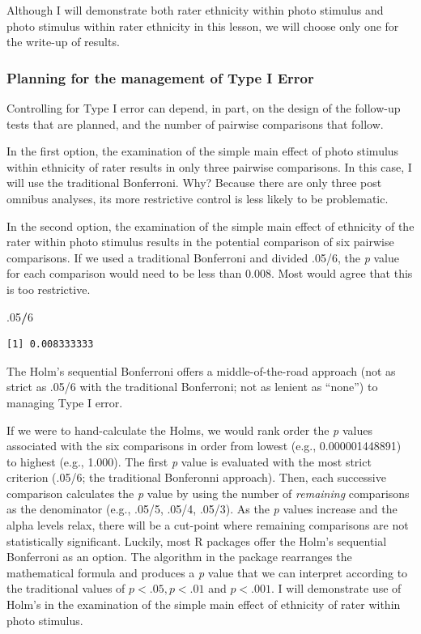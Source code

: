 \documentclass[
  11pt,
]{book}
\newenvironment{Shaded}{\begin{snugshade}}{\end{snugshade}}
\newcommand{\DecValTok}[1]{\textcolor[rgb]{0.06,0.06,0.06}{#1}}
\newcommand{\NormalTok}[1]{#1}
\newcommand{\SpecialCharTok}[1]{\textcolor[rgb]{0.43,0.43,0.43}{\textbf{#1}}}
\begin{document}
Although I will demonstrate both rater ethnicity within photo stimulus and photo stimulus within rater ethnicity in this lesson, we will choose only one for the write-up of results.

\hypertarget{planning-for-the-management-of-type-i-error-1}{%
\subsubsection{Planning for the management of Type I Error}\label{planning-for-the-management-of-type-i-error-1}}

Controlling for Type I error can depend, in part, on the design of the follow-up tests that are planned, and the number of pairwise comparisons that follow.

In the first option, the examination of the simple main effect of photo stimulus within ethnicity of rater results in only three pairwise comparisons. In this case, I will use the traditional Bonferroni. Why? Because there are only three post omnibus analyses, its more restrictive control is less likely to be problematic.

In the second option, the examination of the simple main effect of ethnicity of the rater within photo stimulus results in the potential comparison of six pairwise comparisons. If we used a traditional Bonferroni and divided .05/6, the \emph{p} value for each comparison would need to be less than 0.008. Most would agree that this is too restrictive.

\begin{Shaded}
\begin{Highlighting}[]
\NormalTok{.}\DecValTok{05}\SpecialCharTok{/}\DecValTok{6}
\end{Highlighting}
\end{Shaded}

\begin{verbatim}
[1] 0.008333333
\end{verbatim}

The Holm's sequential Bonferroni \citep{green_using_2017} offers a middle-of-the-road approach (not as strict as .05/6 with the traditional Bonferroni; not as lenient as ``none'') to managing Type I error.

If we were to hand-calculate the Holms, we would rank order the \emph{p} values associated with the six comparisons in order from lowest (e.g., 0.000001448891) to highest (e.g., 1.000). The first \emph{p} value is evaluated with the most strict criterion (.05/6; the traditional Bonferonni approach). Then, each successive comparison calculates the \emph{p} value by using the number of \emph{remaining} comparisons as the denominator (e.g., .05/5, .05/4, .05/3). As the \emph{p} values increase and the alpha levels relax, there will be a cut-point where remaining comparisons are not statistically significant. Luckily, most R packages offer the Holm's sequential Bonferroni as an option. The algorithm in the package rearranges the mathematical formula and produces a \emph{p} value that we can interpret according to the traditional values of \(p < .05, p < .01\) and \(p < .001\). I will demonstrate use of Holm's in the examination of the simple main effect of ethnicity of rater within photo stimulus.
\end{document}
